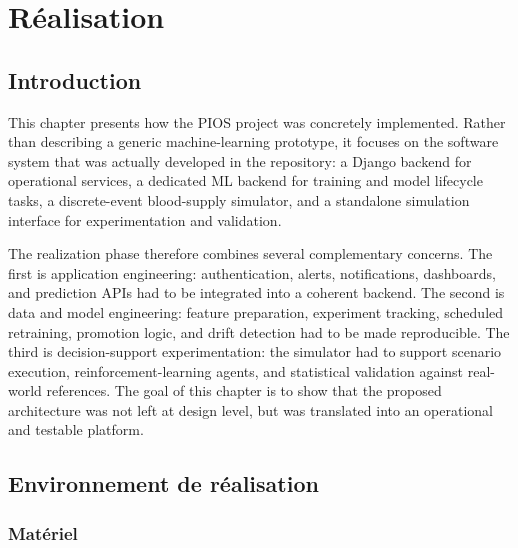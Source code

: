 
\chapter{Réalisation}
\label{chap:realization}

\section{Introduction}
\label{sec:realization-introduction}

This chapter presents how the PIOS project was concretely implemented. Rather than describing a generic machine-learning prototype, it focuses on the software system that was actually developed in the repository: a Django backend for operational services, a dedicated ML backend for training and model lifecycle tasks, a discrete-event blood-supply simulator, and a standalone simulation interface for experimentation and validation.

The realization phase therefore combines several complementary concerns. The first is application engineering: authentication, alerts, notifications, dashboards, and prediction APIs had to be integrated into a coherent backend. The second is data and model engineering: feature preparation, experiment tracking, scheduled retraining, promotion logic, and drift detection had to be made reproducible. The third is decision-support experimentation: the simulator had to support scenario execution, reinforcement-learning agents, and statistical validation against real-world references. The goal of this chapter is to show that the proposed architecture was not left at design level, but was translated into an operational and testable platform.

\section{Environnement de réalisation}
\label{sec:realization-environment}

\subsection{Matériel}
\label{sec:hardware-environment}

